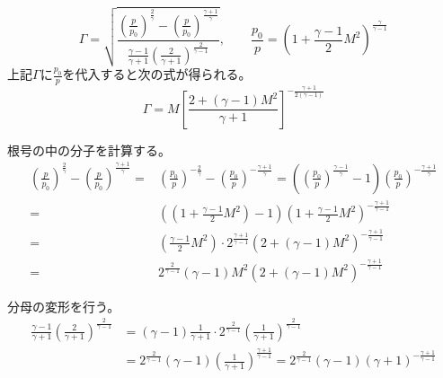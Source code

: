 \documentclass[12pt,b5paper]{ltjsarticle}
\begin{document}
\begin{equation}
 \Gamma =
  \sqrt{
    \frac{
      \left(\frac{p}{p_{0}}\right)^{\frac{2}{\gamma}}
      -\left(\frac{p}{p_{0}}\right)^{\frac{\gamma+1}{\gamma}}
      }{
        \frac{\gamma-1}{\gamma+1}\left(\frac{2}{\gamma+1}\right)^{\frac{2}{\gamma-1}}
      }
  }
  ,\qquad
  \frac{p_{0}}{p}= \left(1+\frac{\gamma-1}{2}M^{2} \right)^{\frac{\gamma}{\gamma-1}}
\end{equation}
上記$\Gamma$に$\frac{p_{0}}{p}$を代入すると次の式が得られる。
\begin{equation}
 \Gamma=M\left[ \frac{2+(\gamma-1)M^{2}}{\gamma+1}\right]^{-\frac{\gamma+1}{2(\gamma-1)}}
\end{equation}
\hrulefill


根号の中の分子を計算する。
\begin{align}
  \left(\frac{p}{p_{0}}\right)^{\frac{2}{\gamma}}
 -\left(\frac{p}{p_{0}}\right)^{\frac{\gamma+1}{\gamma}}
 =&
 \left(\frac{p_{0}}{p}\right)^{-\frac{2}{\gamma}}
 -\left(\frac{p_{0}}{p}\right)^{-\frac{\gamma+1}{\gamma}}
 =
 \left(
 \left(\frac{p_{0}}{p}\right)^{\frac{\gamma-1}{\gamma}}
 -1\right)\left(\frac{p_{0}}{p}\right)^{-\frac{\gamma+1}{\gamma}}\\
 =&
 \left(
 \left(1+\frac{\gamma-1}{2}M^{2} \right)
 -1
 \right)
 \left(1+\frac{\gamma-1}{2}M^{2} \right)^{-\frac{\gamma+1}{\gamma-1}}\\
 =&
 \left(
 \frac{\gamma-1}{2}M^{2}
 \right)
 \cdot 2^{\frac{\gamma+1}{\gamma-1}} \left(2+(\gamma-1)M^{2} \right)^{-\frac{\gamma+1}{\gamma-1}}\\
 =&
 2^{\frac{2}{\gamma-1}}
  (\gamma-1)M^{2}\left(2+(\gamma-1)M^{2} \right)^{-\frac{\gamma+1}{\gamma-1}}
\end{align}

分母の変形を行う。
\begin{align}
 \frac{\gamma-1}{\gamma+1}\left(\frac{2}{\gamma+1}\right)^{\frac{2}{\gamma-1}}
 &=
 (\gamma-1)\frac{1}{\gamma+1}
 \cdot 2^{\frac{2}{\gamma-1}}\left(\frac{1}{\gamma+1}\right)^{\frac{2}{\gamma-1}}\\
 &=2^{\frac{2}{\gamma-1}}(\gamma-1)
 \left(\frac{1}{\gamma+1}\right)^{\frac{\gamma+1}{\gamma-1}}
 =2^{\frac{2}{\gamma-1}}(\gamma-1)(\gamma+1)^{-\frac{\gamma+1}{\gamma-1}}
\end{align}
\end{document}
